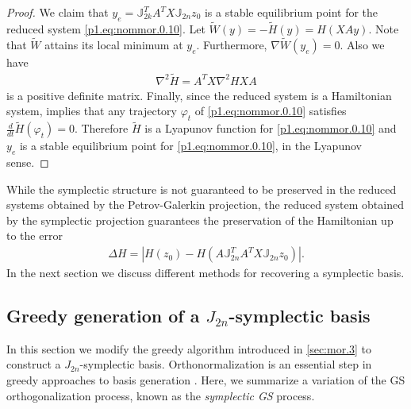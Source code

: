{{\begin{proof}
We claim that $y_e = \mathbb J_{2k}^T A^T X \mathbb J_{2n} z_0$ is a stable equilibrium point for the reduced system \eqref{p1.eq:nommor.0.10}. Let $\tilde W (y) = -\tilde H (y) = H(XAy)$. Note that $\tilde W$ attains its local minimum at $y_e$. Furthermore, $\nabla \tilde W(y_e) = 0$. Also we have
\begin{eqnarray}
	\nabla^2 \tilde H = A^T X \nabla^2 H X A
\end{eqnarray}
is a positive definite matrix. Finally, since the reduced system is a Hamiltonian system,  implies that any trajectory $\varphi_t$ of \eqref{p1.eq:nommor.0.10} satisfies $\frac{d}{dt} \tilde H(\varphi_t) = 0$. Therefore $\tilde H$ is a Lyapunov function for \eqref{p1.eq:nommor.0.10} and $y_e$ is a stable equilibrium point for \eqref{p1.eq:nommor.0.10}, in the Lyapunov sense.

\end{proof}
}

While the symplectic structure is not guaranteed to be preserved in the reduced systems obtained by the Petrov-Galerkin projection, the reduced system obtained by the symplectic projection guarantees the preservation of the Hamiltonian up to the error
\begin{eqnarray}
	\Delta H = | H(z_0) - H( A \mathbb J_{2n}^T A^T X \mathbb J_{2n} z_0) |.
\end{eqnarray}
In the next section we discuss  different methods for recovering a symplectic basis.
}

\subsection{Greedy generation of a $J_{2n}$-symplectic basis} \label{sec:normmor.2}
In this section we modify the greedy algorithm introduced in \cref{sec:mor.3} to construct a $J_{2n}$-symplectic basis. Orthonormalization is an essential step in greedy approaches to basis generation \cite{hesthaven2015certified,quarteroni2015reduced}. Here, we summarize a variation of the GS orthogonalization process, known as the \emph{symplectic GS} process.

